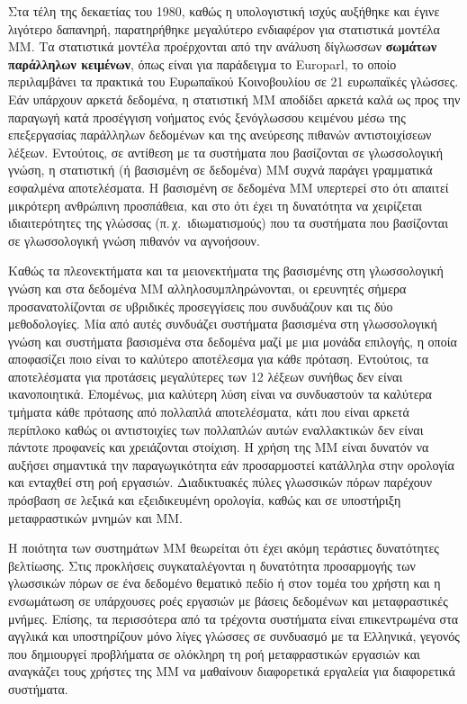 \begin{multicols}{2}
Στα τέλη της δεκαετίας του 1980, καθώς η υπολογιστική ισχύς αυξήθηκε και έγινε λιγότερο δαπανηρή, παρατηρήθηκε  μεγαλύτερο ενδιαφέρον για στατιστικά μοντέλα ΜΜ. Τα στατιστικά μοντέλα προέρχονται από την ανάλυση δίγλωσσων \textbf{σωμάτων παράλληλων κειμένων}, όπως είναι για παράδειγμα το Europarl, το οποίο περιλαμβάνει τα πρακτικά του Ευρωπαϊκού Κοινοβουλίου σε 21 ευρωπαϊκές γλώσσες. Εάν υπάρχουν αρκετά δεδομένα, η στατιστική MΜ αποδίδει αρκετά καλά ως προς την παραγωγή κατά προσέγγιση νοήματος ενός ξενόγλωσσου κειμένου μέσω της επεξεργασίας παράλληλων δεδομένων και της ανεύρεσης πιθανών αντιστοιχίσεων λέξεων. Εντούτοις, σε αντίθεση με τα συστήματα που βασίζονται σε γλωσσολογική γνώση, η στατιστική (ή βασισμένη σε δεδομένα) MΜ συχνά παράγει γραμματικά εσφαλμένα αποτελέσματα. Η βασισμένη σε δεδομένα ΜΜ υπερτερεί στο ότι απαιτεί μικρότερη ανθρώπινη προσπάθεια, και στο ότι έχει τη δυνατότητα να χειρίζεται ιδιαιτερότητες της γλώσσας (π.\,χ.~ιδιωματισμούς) που τα συστήματα που βασίζονται σε γλωσσολογική γνώση πιθανόν να αγνοήσουν.

Καθώς τα πλεονεκτήματα και τα μειονεκτήματα της βασισμένης στη γλωσσολογική γνώση και στα δεδομένα MΜ αλληλοσυμπληρώνονται, οι ερευνητές σήμερα προσανατολίζονται σε υβριδικές προσεγγίσεις που συνδυάζουν και τις δύο μεθοδολογίες. Μία από αυτές συνδυάζει συστήματα βασισμένα στη γλωσσολογική γνώση και συστήματα βασισμένα στα δεδομένα μαζί με μια μονάδα επιλογής, η οποία αποφασίζει ποιο είναι το καλύτερο αποτέλεσμα για κάθε πρόταση. Εντούτοις, τα αποτελέσματα για προτάσεις μεγαλύτερες των 12 λέξεων συνήθως δεν είναι ικανοποιητικά. Επομένως, μια καλύτερη λύση είναι να συνδυαστούν τα καλύτερα τμήματα κάθε πρότασης από πολλαπλά αποτελέσματα, κάτι που είναι αρκετά περίπλοκο καθώς οι αντιστοιχίες των πολλαπλών αυτών εναλλακτικών δεν είναι πάντοτε προφανείς και χρειάζονται στοίχιση. Η χρήση της ΜΜ είναι δυνατόν να αυξήσει σημαντικά την παραγωγικότητα εάν προσαρμοστεί κατάλληλα στην ορολογία και ενταχθεί στη ροή εργασιών. Διαδικτυακές πύλες γλωσσικών πόρων παρέχουν πρόσβαση σε λεξικά και εξειδικευμένη ορολογία, καθώς και σε υποστήριξη μεταφραστικών μνημών και ΜΜ. 

Η ποιότητα των συστημάτων MΜ θεωρείται ότι έχει ακόμη τεράστιες δυνατότητες βελτίωσης. Στις προκλήσεις συγκαταλέγονται η δυνατότητα προσαρμογής των γλωσσικών πόρων σε ένα δεδομένο θεματικό πεδίο ή στον τομέα του χρήστη και η ενσωμάτωση σε υπάρχουσες ροές εργασιών με βάσεις δεδομένων και μεταφραστικές μνήμες. Επίσης, τα περισσότερα από τα τρέχοντα συστήματα είναι επικεντρωμένα στα αγγλικά και υποστηρίζουν μόνο λίγες γλώσσες σε συνδυασμό με τα Ελληνικά, γεγονός  που δημιουργεί προβλήματα σε ολόκληρη τη ροή μεταφραστικών εργασιών και αναγκάζει τους χρήστες της MΜ να μαθαίνουν διαφορετικά εργαλεία για διαφορετικά συστήματα.


\end{multicols}
